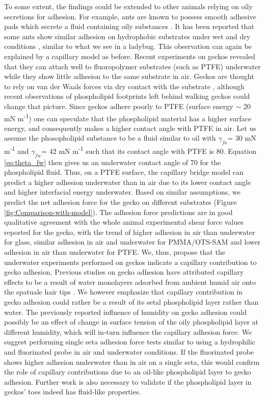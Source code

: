 \documentclass[vruler,JEB]{COB}%
\begin{document}
To some extent, the findings could be extended to other animals relying on oily
secretions for adhesion. For example, ants are known to possess smooth adhesive pads which secrete a fluid containing oily substances \citep{RN201}.
It has been reported that some ants show similar adhesion on hydrophobic substrates under wet and dry conditions \citep{RN213},
similar to what we see in a ladybug. This observation can again be explained by a capillary model as before. Recent experiments on
geckos revealed that they can attach well to fluoropolymer substrates (such as PTFE)
underwater while they show little adhesion to the same substrate in
air\citep{RN199,RN15}. Geckos are thought to rely on van der Waals
forces via dry contact with the substrate \citep{RN202}, although
recent observations of phospholipid footprints left behind walking
geckos \citep{RN205} could change that picture. Since geckos adhere
poorly to PTFE (surface energy $\sim$ 20 mN m\protect\textsuperscript{-1}) one can
speculate that the phospholipid material has a higher surface energy,
and consequently makes a higher contact angle with PTFE in air. Let
us assume the phosopholipid substance to be a fluid similar to oil 
with $\gamma_{fa}$= 30 mN m\protect\textsuperscript{-1} and $\gamma_{fw}$= 42 mN m\protect\textsuperscript{-1} such that
its contact angle with PTFE is 80\textdegree . Equation \ref{eq:theta_fw}
then gives us an underwater contact angle of 70\textdegree{} for the
phospholipid fluid. Thus, on a PTFE surface, the capillary bridge
model can predict a higher adhesion underwater than in air due to
its lower contact angle and higher interfacial energy underwater.
Based on similar assumptions, we predict the net adhesion force for
the gecko on different substrates (Figure \ref{fig:Comparison-with-model}).
The adhesion force predictions are in good qualitative agreement with
the whole animal experimental shear force values reported for the
gecko, with the trend of higher adhesion in air than underwater for
glass, similar adhesion in air and underwater for PMMA/OTS-SAM and
lower adhesion in air than underwater for PTFE. We, thus, propose
that the underwater experiments performed on geckos \citep{RN199,RN15}
indicate a capillary contribution to gecko adhesion. Previous studies on gecko adhesion have attributed capillary effects to be a result of water monolayers adsorbed from ambient humid air onto the spatuale hair tips \citep{RN197, RN203, RN218}.
We however emphasize that capillary contribution in gecko adhesion could rather be a result of its setal phospholipid layer rather than water.
The previously reported influence of humidity on gecko adhesion \citep{RN197} could possibly be an effect of change in surface tension of the oily phospholipid layer at different humidity, which will in-turn influence the capillary adhesion force. We suggest performing single seta adhesion force tests similar to \citet{RN202}
using a hydrophilic and fluorinated probe in air and underwater conditions. 
If the fluorinated probe shows higher adhesion underwater than in air on a single seta, this
would confirm the role of capillary contributions due to an oil-like phospholipid layer to gecko adhesion. Further work is also necessary to validate if the phospholipid layer in geckos' toes indeed has fluid-like properties.
\end{document}
